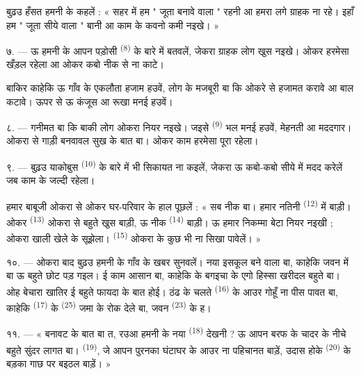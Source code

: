 बुढ़उ हँसत हमनी के कहलें : « सहर में हम " जूता बनावे वाला " रहनी आ
हमरा लगे ग्राहक ना रहे। इहाँ हम " जूता सीये वाला " बानी आ काम के कवनो
कमी नइखे। »

७. --- ऊ हमनी के आपन पड़ोसी  \textsuperscript{(8)} के बारे
में बतवलें, जेकरा ग्राहक लोग खुस नइखे। ओकर  हरमेसा
खँड़ल रहेला आ ओकर  कबो नीक से ना काटे।

बाकिर काहेकि ऊ गाँव के एकलौता हजाम हउवें, लोग के मजबूरी बा कि ओकरे से
हजामत करावे आ बाल कटावे। ऊपर से ऊ कंजूस आ रूखा मनई हउवें।

८. --- गनीमत बा कि बाकी  लोग ओकरा नियर नइखे। जइसे
 \textsuperscript{(9)} भल मनई हउवें, मेहनती आ
मददगार। ओकरा से गाड़ी बनवावल सुख के बात बा। ओकर काम हरमेसा पूरा रहेला।

९. --- बुढ़उ याकोबुस  \textsuperscript{(10)} के
बारे में भी सिकायत ना कइलें, जेकरा ऊ कबो-कबो  सीये में मदद
करेलें जब काम के जल्दी रहेला।

हमार बाबूजी ओकरा से ओकर घर-परिवार के हाल पूछलें : « सब नीक बा। हमार
नतिनी  \textsuperscript{(12)} में बाड़ी। ओकर
 \textsuperscript{(13)} ओकरा से बहुते खुस बाड़ी, ऊ नीक
 \textsuperscript{(14)} बाड़ी। ऊ हमार निकम्मा बेटा
नियर नइखी ; ओकरा खाली खेले के सूझेला। 
\textsuperscript{(15)} ओकरा के कुछ भी ना सिखा पावेलें। »

\VUsaut{3.0mm}
\VUsaut{3.0mm}

१०. --- ओकरा बाद बुढ़उ हमनी के गाँव के खबर सुनवलें। नया इसकूल बने वाला
बा, काहेकि जवन  में बा ऊ बहुते छोट पड़ गइल। ई काम
आसान बा, काहेकि  के बगइचा के एगो हिस्सा खरीदल
बहुते बा। ओह बेचारा खातिर ई बहुते फायदा के बात होई। ठंढ के चलते
 \textsuperscript{(16)} के  आउर गोहूँ ना पीस
पावत बा, काहेकि  \textsuperscript{(17)} के 
\textsuperscript{(25)} जमा के रोक देले बा, जवन 
\textsuperscript{(23)} के ह।

११. --- « बनावट के बात बा त, रउआ हमनी के नया 
\textsuperscript{(18)} देखनी ? ऊ आपन बरफ के चादर के नीचे बहुते सुंदर
लागत बा।  \textsuperscript{(19)}, जे आपन पुरनका घंटाघर के आउर
ना पहिचानत बाड़ें, उदास होके  \textsuperscript{(20)} के
बड़का गाछ पर बइठल बाड़ें। »

